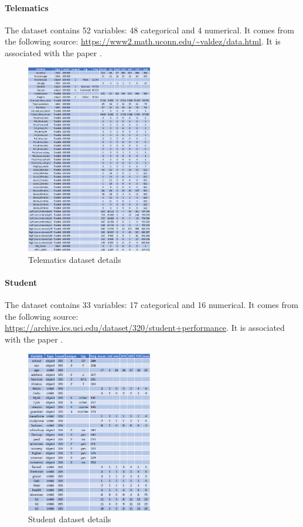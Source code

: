 \documentclass{article}
\theoremstyle{definition}
\begin{document}
\paragraph{Telematics}
The dataset contains 52 variables: 48 categorical and 4 numerical. It comes from the following source: \url{https://www2.math.uconn.edu/~valdez/data.html}. It is associated with the paper \citep{so2021synthetic}.
\begin{figure}[H]
     \centering
     \includegraphics[width=0.49\textwidth]{imgs/Dataset_Details/Telematics_Details.png}
     \caption{Telematics dataset details}
\end{figure}



\paragraph{Student}
The dataset contains 33 variables: 17 categorical and 16 numerical. It comes from the following source: \url{https://archive.ics.uci.edu/dataset/320/student+performance}. It is associated with the paper \citep{cortez2008using}.
\begin{figure}[H]
     \centering
     \includegraphics[width=0.49\textwidth]{imgs/Dataset_Details/Student_Details.png}
     \caption{Student dataset details}
\end{figure}
\end{document}
